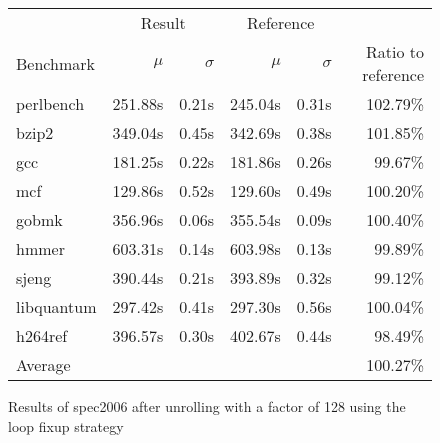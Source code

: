 \begin{figure}[h]
    \begin{center}
        \begin{tabular}{lrrrrr}
            \toprule
            & \multicolumn{2}{c}{Result} & \multicolumn{2}{c}{Reference}\\
            Benchmark & $\mu$ & $\sigma$ & $\mu$ & $\sigma$ & Ratio to reference\\
            \midrule
            perlbench & 251.88s & 0.21s & 245.04s & 0.31s & 102.79\%\\
            bzip2 & 349.04s & 0.45s & 342.69s & 0.38s & 101.85\%\\
            gcc & 181.25s & 0.22s & 181.86s & 0.26s & 99.67\%\\
            mcf & 129.86s & 0.52s & 129.60s & 0.49s & 100.20\%\\
            gobmk & 356.96s & 0.06s & 355.54s & 0.09s & 100.40\%\\
            hmmer & 603.31s & 0.14s & 603.98s & 0.13s & 99.89\%\\
            sjeng & 390.44s & 0.21s & 393.89s & 0.32s & 99.12\%\\
            libquantum & 297.42s & 0.41s & 297.30s & 0.56s & 100.04\%\\
            h264ref & 396.57s & 0.30s & 402.67s & 0.44s & 98.49\%\\
            \midrule
            Average & & & & & 100.27\%\\
            \bottomrule
        \end{tabular}
    \end{center}
    \caption{Results of spec2006 after unrolling with a factor of 128 using the loop fixup strategy}
    \label{fig:eval:perf:loop:128}
\end{figure}
